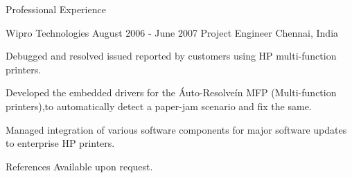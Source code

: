 \documentclass{resume}
\begin{document}
\begin{rSection}{Professional Experience}
    \begin{rSubsection}
    {Wipro Technologies}
    {August 2006 - June 2007}
    {Project Engineer}
    {Chennai, India}
    \item Debugged and resolved issued reported by customers using HP 
    multi-function printers.
    \item Developed the embedded drivers for the \'Auto-Resolve\' in MFP 
    (Multi-function printers),to automatically detect a paper-jam scenario and 
    fix the same.
    \item Managed integration of various software components for major software 
    updates to  enterprise HP printers.
    \end{rSubsection}  
  \end{rSection}
   
  \begin{rSection}{References}
    Available upon request. 
  \end{rSection}
   
\end{document}
